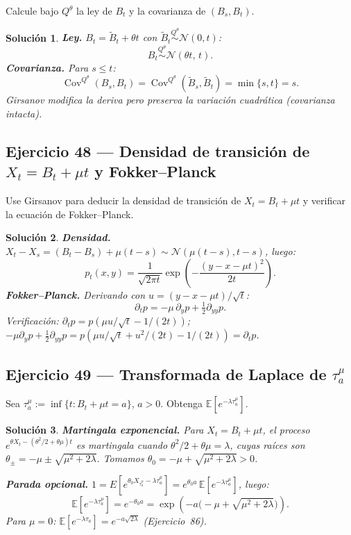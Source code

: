 \documentclass[12pt,letterpaper]{article}
\theoremstyle{ejercicio}
\theoremstyle{solucion}
\newtheorem*{solucion}{Solución}
\newcommand{\E}{\mathbb{E}}
\newcommand{\Cov}{\operatorname{Cov}}
\begin{document}
\begin{recuadro}
Calcule bajo $Q^\theta$ la ley de $B_t$ y la covarianza de $(B_s,B_t)$.
\end{recuadro}

\begin{solucion}
\textbf{Ley.} $B_t=\tilde B_t+\theta t$ con $\tilde B_t\overset{Q^\theta}{\sim}\mathcal{N}(0,t)$:
\[
  B_t\overset{Q^\theta}{\sim}\mathcal{N}(\theta t,\,t).
\]
\textbf{Covarianza.} Para $s\le t$:
\[
  \Cov^{Q^\theta}(B_s,B_t)=\Cov^{Q^\theta}(\tilde B_s,\tilde B_t)=\min\{s,t\}=s.
\]
Girsanov modifica la deriva pero preserva la variación cuadrática (covarianza intacta).
\end{solucion}

\subsection*{Ejercicio 48 — Densidad de transición de $X_t=B_t+\mu t$ y Fokker–Planck}

\begin{recuadro}
Use Girsanov para deducir la densidad de transición de $X_t=B_t+\mu t$ y verificar la
ecuación de Fokker–Planck.
\end{recuadro}

\begin{solucion}
\textbf{Densidad.} $X_t-X_s=(B_t-B_s)+\mu(t-s)\sim\mathcal{N}(\mu(t-s),t-s)$, luego:
\[
  p_t(x,y)=\frac{1}{\sqrt{2\pi t}}\exp\!\left(-\frac{(y-x-\mu t)^2}{2t}\right).
\]
\textbf{Fokker–Planck.} Derivando con $u=(y-x-\mu t)/\sqrt{t}$:
\[
  \partial_t p=-\mu\,\partial_y p+\tfrac{1}{2}\partial_{yy}p.
\]
Verificación: $\partial_t p=p(\mu u/\sqrt{t}-1/(2t))$;
$-\mu\partial_y p+\frac{1}{2}\partial_{yy}p=p(\mu u/\sqrt{t}+u^2/(2t)-1/(2t))=\partial_t p$.\;\checkmark
\end{solucion}

\subsection*{Ejercicio 49 — Transformada de Laplace de $\tau_a^\mu$}

\begin{recuadro}
Sea $\tau_a^\mu:=\inf\{t:B_t+\mu t=a\}$, $a>0$. Obtenga $\E[e^{-\lambda\tau_a^\mu}]$.
\end{recuadro}

\begin{solucion}
\textbf{Martingala exponencial.} Para $X_t=B_t+\mu t$, el proceso
$e^{\theta X_t-(\theta^2/2+\theta\mu)t}$ es martingala cuando $\theta^2/2+\theta\mu=\lambda$,
cuyas raíces son $\theta_\pm=-\mu\pm\sqrt{\mu^2+2\lambda}$. Tomamos $\theta_0=-\mu+\sqrt{\mu^2+2\lambda}>0$.

\textbf{Parada opcional.} $1=E[e^{\theta_0 X_{\tau_a^\mu}-\lambda\tau_a^\mu}]=e^{\theta_0 a}\,\E[e^{-\lambda\tau_a^\mu}]$, luego:
\[
  \boxed{\E[e^{-\lambda\tau_a^\mu}]=e^{-\theta_0 a}=\exp\!\left(-a\bigl(-\mu+\sqrt{\mu^2+2\lambda}\bigr)\right).}
\]
Para $\mu=0$: $\E[e^{-\lambda\tau_a}]=e^{-a\sqrt{2\lambda}}$ (Ejercicio~86).
\end{solucion}
\end{document}
